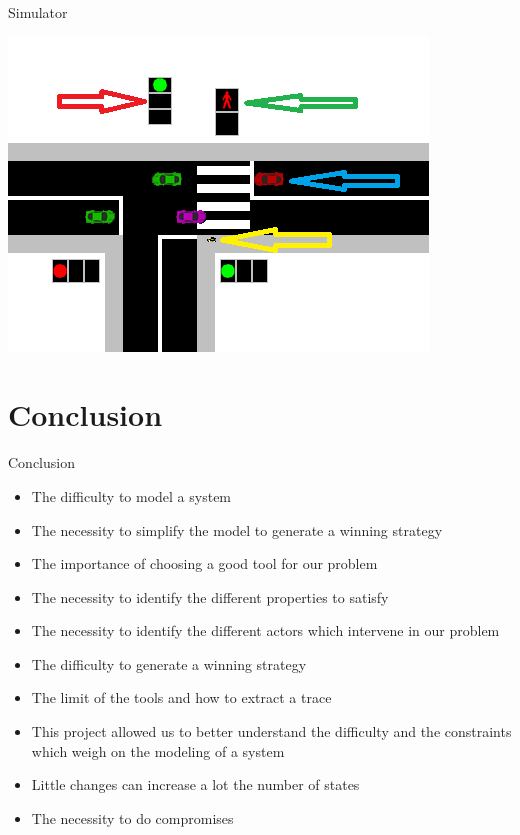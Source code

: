 \documentclass{bredelebeamer}
\begin{document}
\begin{frame}{Simulator}

\centering
\includegraphics[scale=0.8]{images/SimP.PNG}

\end{frame}


\section{Conclusion}
\begin{frame}{Conclusion}

\begin{itemize}

\item The difficulty to model a system

\item The necessity to simplify the model to generate a winning strategy

\item The importance of choosing a good tool for our problem

\item The necessity to identify the different properties to satisfy

\item The necessity to identify the different actors which intervene in our problem

\item The difficulty to generate a winning strategy

\item The limit of the tools and how to extract a trace

\item This project allowed us to better understand the difficulty and the constraints which weigh on the modeling of a system

\item Little changes can increase a lot the number of states

\item The necessity to do compromises

\end{itemize}

\end{frame}
\end{document}
